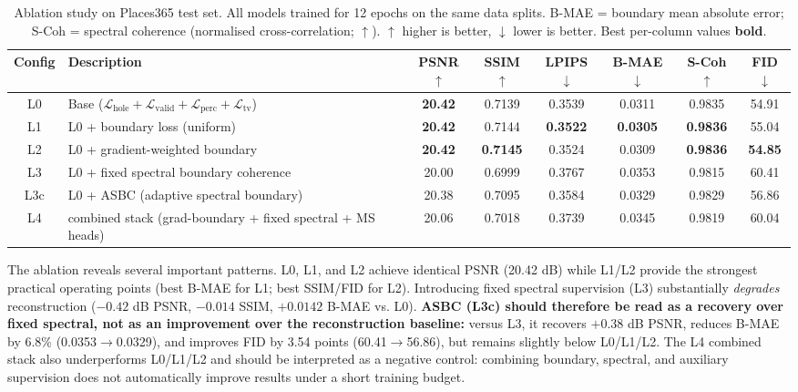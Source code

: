 \documentclass[10pt,conference]{IEEEtran}
\newcommand{\Lhole}{\mathcal{L}_{\mathrm{hole}}}
\newcommand{\Lvalid}{\mathcal{L}_{\mathrm{valid}}}
\newcommand{\Lperc}{\mathcal{L}_{\mathrm{perc}}}
\newcommand{\Ltv}{\mathcal{L}_{\mathrm{tv}}}
\begin{document}
\begin{table}[t]
  \centering
  \caption{Ablation study on Places365 test set. All models trained for
    12 epochs on the same data splits. B-MAE = boundary mean absolute error;
    S-Coh = spectral coherence (normalised cross-correlation; $\uparrow$).
    $\uparrow$ higher is better, $\downarrow$ lower is better. Best per-column
    values \textbf{bold}.}
  \label{tab:ablation}
  \setlength{\tabcolsep}{6pt}
  \begin{tabular}{clcccccc}
    \toprule
    \textbf{Config} & \textbf{Description}
      & \textbf{PSNR}$\uparrow$ & \textbf{SSIM}$\uparrow$
      & \textbf{LPIPS}$\downarrow$ & \textbf{B-MAE}$\downarrow$
      & \textbf{S-Coh}$\uparrow$ & \textbf{FID}$\downarrow$ \\
    \midrule
    L0 & Base ($\Lhole + \Lvalid + \Lperc + \Ltv$)
       & \textbf{20.42} & 0.7139 & 0.3539 & 0.0311 & 0.9835 & 54.91 \\
    L1 & L0 + boundary loss (uniform)
       & \textbf{20.42} & 0.7144 & \textbf{0.3522} & \textbf{0.0305} & \textbf{0.9836} & 55.04 \\
    L2 & L0 + gradient-weighted boundary
       & \textbf{20.42} & \textbf{0.7145} & 0.3524 & 0.0309 & \textbf{0.9836} & \textbf{54.85} \\
    L3 & L0 + fixed spectral boundary coherence
       & 20.00 & 0.6999 & 0.3767 & 0.0353 & 0.9815 & 60.41 \\
     L3c & L0 + ASBC (adaptive spectral boundary)
       & 20.38 & 0.7095 & 0.3584 & 0.0329 & 0.9829 & 56.86 \\
     L4 & combined stack (grad-boundary + fixed spectral + MS heads)
       & 20.06 & 0.7018 & 0.3739 & 0.0345 & 0.9819 & 60.04 \\
    \bottomrule
  \end{tabular}
\end{table}

The ablation reveals several important patterns.
L0, L1, and L2 achieve identical PSNR (20.42 dB) while L1/L2 provide the
strongest practical operating points (best B-MAE for L1; best SSIM/FID for L2).
Introducing fixed spectral supervision (L3) substantially \emph{degrades}
reconstruction ($-0.42$ dB PSNR, $-0.014$ SSIM, $+0.0142$ B-MAE vs. L0).
\textbf{ASBC (L3c) should therefore be read as a recovery over fixed spectral, not
as an improvement over the reconstruction baseline:} versus L3, it recovers
$+0.38$ dB PSNR, reduces B-MAE by 6.8\% (0.0353$\to$0.0329), and improves FID by
3.54 points (60.41$\to$56.86), but remains slightly below L0/L1/L2.
The L4 combined stack also underperforms L0/L1/L2 and should be interpreted as
a negative control: combining boundary, spectral, and auxiliary supervision
does not automatically improve results under a short training budget.
\end{document}
